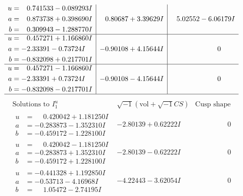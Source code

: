 \documentclass[1p]{elsarticle_modified}
\theoremstyle{definition}
\newcommand{\I}{\sqrt{-1}}
\begin{document}
$$\begin{array}{c|c|c}
\begin{aligned}
u &= \phantom{-}0.741533 - 0.089293 I \\
a &= \phantom{-}0.873738 + 0.398690 I \\
b &= \phantom{-}0.309943 - 1.288770 I\end{aligned}
 & \phantom{-}0.80687 + 3.39629 I & \phantom{-}5.02552 - 6.06179 I \\ \hline\begin{aligned}
u &= \phantom{-}0.457271 + 1.166860 I \\
a &= -2.33391 - 0.73724 I \\
b &= -0.832098 + 0.217701 I\end{aligned}
 & -0.90108 + 4.15644 I & \phantom{-0.000000 } 0 \\ \hline\begin{aligned}
u &= \phantom{-}0.457271 - 1.166860 I \\
a &= -2.33391 + 0.73724 I \\
b &= -0.832098 - 0.217701 I\end{aligned}
 & -0.90108 - 4.15644 I & \phantom{-0.000000 } 0\\
 \hline 
 \end{array}$$\newpage$$\begin{array}{c|c|c}  
\text{Solutions to }I^u_{1}& \I (\text{vol} + \sqrt{-1}CS) & \text{Cusp shape}\\
 \hline 
\begin{aligned}
u &= \phantom{-}0.420042 + 1.181250 I \\
a &= -0.283873 - 1.352310 I \\
b &= -0.459172 - 1.228100 I\end{aligned}
 & -2.80139 + 0.62222 I & \phantom{-0.000000 } 0 \\ \hline\begin{aligned}
u &= \phantom{-}0.420042 - 1.181250 I \\
a &= -0.283873 + 1.352310 I \\
b &= -0.459172 + 1.228100 I\end{aligned}
 & -2.80139 - 0.62222 I & \phantom{-0.000000 } 0 \\ \hline\begin{aligned}
u &= -0.441328 + 1.192850 I \\
a &= -0.53713 - 4.16968 I \\
b &= \phantom{-}1.05472 - 2.74195 I\end{aligned}
 & -4.22443 - 3.62054 I & \phantom{-0.000000 } 0 \\ \hline\begin{aligned}

\end{aligned}
\end{array}$$
\end{document}
